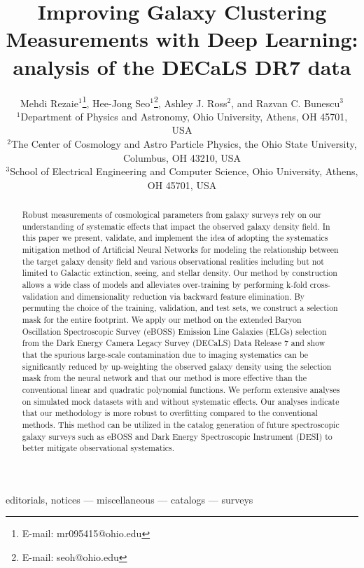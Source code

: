 \documentclass[fleqn, usenatbib]{mnras}
\title[Improving Galaxy Clustering with Deep Learning]{Improving Galaxy Clustering Measurements with Deep Learning: analysis of the DECaLS DR7 data}
\author[M. Rezaie et al.]{
Mehdi Rezaie$^{1}$\thanks{E-mail: mr095415@ohio.edu},
Hee-Jong Seo$^{1}$\thanks{E-mail: seoh@ohio.edu},
Ashley J. Ross$^{2}$,
and Razvan C. Bunescu$^{3}$
\\
$^{1}$Department of Physics and Astronomy, Ohio University, Athens, OH 45701, USA\\
$^{2}$The Center of Cosmology and Astro Particle Physics, the Ohio State University, Columbus, OH 43210, USA\\
$^{3}$School of Electrical Engineering and Computer Science, Ohio University, Athens, OH 45701, USA
}
\begin{document}
\label{firstpage}
\pagerange{\pageref{firstpage}--\pageref{lastpage}}
\maketitle
\linenumbers

\begin{abstract}
Robust measurements of cosmological parameters from galaxy surveys rely on our understanding of systematic effects that impact the observed galaxy density field. In this paper we present, validate, and implement the idea of adopting the systematics mitigation method of Artificial Neural Networks for modeling the relationship between the target galaxy density field and various observational realities including but not limited to Galactic extinction, seeing, and stellar density. Our method by construction allows a wide class of models and alleviates over-training by performing k-fold cross-validation and dimensionality reduction via backward feature elimination. By permuting the choice of the training, validation, and test sets, we construct a selection mask for the entire footprint.  We apply our method on the extended Baryon Oscillation Spectroscopic Survey (eBOSS) Emission Line Galaxies (ELGs) selection from the Dark Energy Camera Legacy Survey (DECaLS) Data Release 7 and show that the spurious large-scale contamination due to imaging systematics can be significantly reduced by up-weighting the observed galaxy density using the selection mask from the neural network and that our method is more effective than the conventional linear and quadratic polynomial functions. We perform extensive analyses on simulated mock datasets with and without systematic effects. Our analyses indicate that our methodology is more robust to overfitting compared to the conventional methods. This method can be utilized in the catalog generation of future spectroscopic galaxy surveys such as eBOSS and Dark Energy Spectroscopic Instrument (DESI) to better mitigate observational systematics.
\end{abstract}

\begin{keywords}
editorials, notices --- 
miscellaneous --- catalogs --- surveys
\end{keywords}








\end{document}
